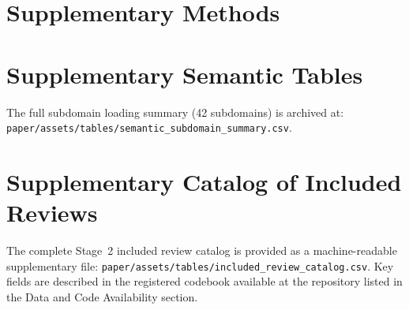 \documentclass[11pt]{article}
\begin{document}
\clearpage
\appendix
\section{Supplementary Methods}
\label{app:methods}


\section{Supplementary Semantic Tables}
\label{app:semantic}



\noindent The full subdomain loading summary (42 subdomains) is archived at:\\
\texttt{paper/assets/tables/semantic\_subdomain\_summary.csv}.

\section{Supplementary Catalog of Included Reviews}
\label{app:catalog}
The complete Stage~2 included review catalog is provided as a machine-readable supplementary file:
\texttt{paper/assets/tables/included\_review\_catalog.csv}. Key fields are described in the registered codebook available at the repository listed in the Data and Code Availability section.
\end{document}
